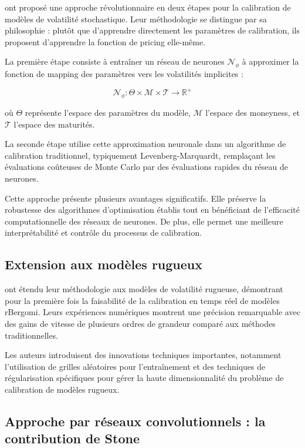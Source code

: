 \citet{bayer2018deep} ont proposé une approche révolutionnaire en deux étapes pour la calibration de modèles de volatilité stochastique. Leur méthodologie se distingue par sa philosophie : plutôt que d'apprendre directement les paramètres de calibration, ils proposent d'apprendre la fonction de pricing elle-même.

La première étape consiste à entraîner un réseau de neurones $\mathcal{N}_\phi$ à approximer la fonction de mapping des paramètres vers les volatilités implicites :

\begin{equation}
\mathcal{N}_\phi : \Theta \times \mathcal{M} \times \mathcal{T} \rightarrow \mathbb{R}^+
\end{equation}

où $\Theta$ représente l'espace des paramètres du modèle, $\mathcal{M}$ l'espace des moneyness, et $\mathcal{T}$ l'espace des maturités.

La seconde étape utilise cette approximation neuronale dans un algorithme de calibration traditionnel, typiquement Levenberg-Marquardt, remplaçant les évaluations coûteuses de Monte Carlo par des évaluations rapides du réseau de neurones.

Cette approche présente plusieurs avantages significatifs. Elle préserve la robustesse des algorithmes d'optimisation établis tout en bénéficiant de l'efficacité computationnelle des réseaux de neurones. De plus, elle permet une meilleure interprétabilité et contrôle du processus de calibration.

\subsection{Extension aux modèles rugueux}

\citet{bayer2019deep} ont étendu leur méthodologie aux modèles de volatilité rugueuse, démontrant pour la première fois la faisabilité de la calibration en temps réel de modèles rBergomi. Leurs expériences numériques montrent une précision remarquable avec des gains de vitesse de plusieurs ordres de grandeur comparé aux méthodes traditionnelles.

Les auteurs introduisent des innovations techniques importantes, notamment l'utilisation de grilles aléatoires pour l'entraînement et des techniques de régularisation spécifiques pour gérer la haute dimensionnalité du problème de calibration de modèles rugueux.

\subsection{Approche par réseaux convolutionnels : la contribution de Stone}

